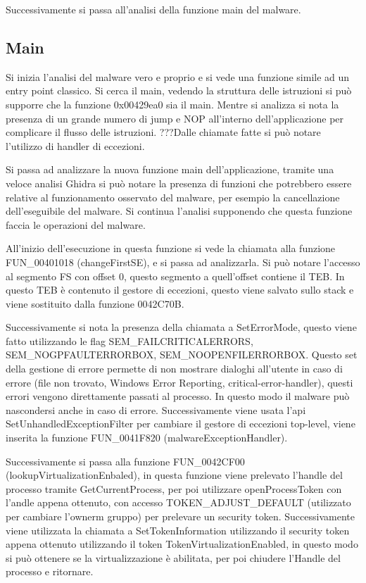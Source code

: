 \documentclass[]{article}
\begin{document}
Successivamente si passa all'analisi della funzione main del malware.

\subsection{Main}


Si inizia l'analisi del malware vero e proprio e si vede una funzione simile ad un entry point classico. Si cerca il main, vedendo la struttura delle istruzioni si può supporre che la funzione 0x00429ea0 sia il main. 
Mentre si analizza si nota la presenza di un grande numero di jump e NOP all'interno dell'applicazione per complicare il flusso delle istruzioni.
???Dalle chiamate fatte si può notare l'utilizzo di handler di eccezioni.

Si passa ad analizzare la nuova funzione main dell'applicazione, tramite una veloce analisi Ghidra si può notare la presenza di funzioni che potrebbero essere relative al funzionamento osservato del malware, per esempio la cancellazione dell'eseguibile del malware. Si continua l'analisi supponendo che questa funzione faccia le operazioni del malware.

All'inizio dell'esecuzione in questa funzione si vede la chiamata alla funzione FUN\_00401018 (changeFirstSE), e si passa ad analizzarla. Si può notare l'accesso al segmento FS con offset 0, questo segmento a quell'offset contiene il TEB. In questo TEB è contenuto il gestore di eccezioni, questo viene salvato sullo stack e viene sostituito dalla funzione 0042C70B.

Successivamente si nota la presenza della chiamata a SetErrorMode, questo viene fatto utilizzando le flag SEM\_FAILCRITICALERRORS, SEM\_NOGPFAULTERRORBOX, SEM\_NOOPENFILERRORBOX. Questo set della gestione di errore permette di non mostrare dialoghi all'utente in caso di errore (file non trovato, Windows Error Reporting, critical-error-handler), questi errori vengono direttamente passati al processo. In questo modo il malware può nascondersi anche in caso di errore. Successivamente viene usata l'api SetUnhandledExceptionFilter per cambiare il gestore di eccezioni top-level, viene inserita la funzione FUN\_0041F820 (malwareExceptionHandler).

Successivamente si passa alla funzione FUN\_0042CF00 (lookupVirtualizationEnbaled), in questa funzione viene prelevato l'handle del processo tramite GetCurrentProcess, per poi utilizzare openProcessToken con l'andle appena ottenuto, con accesso TOKEN\_ADJUST\_DEFAULT (utilizzato per cambiare l'ownerm gruppo) per prelevare un security token. Successivamente viene utilizzata la chiamata a SetTokenInformation utilizzando il security token appena ottenuto utilizzando il token TokenVirtualizationEnabled, in questo modo si può ottenere se la virtualizzazione è abilitata, per poi chiudere l'Handle del processo e ritornare.
\end{document}
